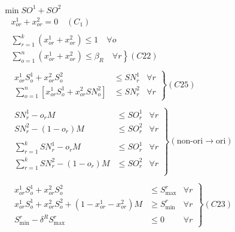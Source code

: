 \documentclass[10pt,twocolumn]{article}
\begin{document}
\begin{displaymath}
    \begin{array}{l}
        \min SO^1 + SO^2 \\
        \quad x_{or}^1 + x_{or}^2 = 0 \quad (C_1) \\
        \\
        \quad \sum_{r = 1}^k (x_{or}^1 + x_{or}^2) \leq 1 \quad \forall o \\
        \quad \left. \sum_{o = 1}^n (x_{or}^1 + x_{or}^2) \leq \beta_R \quad \forall r \right\} (C22) \\
        \\
        \quad \left.
            \begin{array}{rll}
                x_{or}^1 S_o^1 + x_{or}^2 S_o^2 & \leq SN_r^1 & \forall r \\
                \sum_{o = 1}^n \left[ x_{or}^1 S_o^1 + x_{or}^2 SN_o^2 \right] & \leq SN_r^2 & \forall r
            \end{array} \right\} (C25) \\
        \\
        \quad \left.
            \begin{array}{rll}
                SN_r^1 - o_rM & \leq SO_r^1 & \forall r \\
                SN_r^2 - (1 - o_r)M & \leq SO_r^2 & \forall r \\
                \\
                \sum_{r = 1}^k SN_r^1 - o_rM & \leq SO_r^1 & \forall r \\
                \sum_{r = 1}^k SN_r^2 - (1 - o_r)M & \leq SO_r^2 & \forall r \\
        \end{array} \right\} (\mbox{non-ori} \rightarrow \mbox{ori}) \\
        \\
        \quad \left.
            \begin{array}{rll}
                x_{or}^1S_o^1 + x_{or}^2S_o^2 & \leq S_{\max}^r & \forall r \\
                x_{or}^1S_o^1 + x_{or}^2S_o^2 + (1 - x_{or}^1 - x_{or}^2)M & \geq S_{\min}^r & \forall r \\
                S_{\min}^r - \delta^R S_{\max}^r & \leq 0 & \forall r
        \end{array} \right\} (C23) \\
        \\
        \quad \left.
            \begin{array}{rll}

\end{array}
\end{array}
\end{displaymath}
\end{document}

